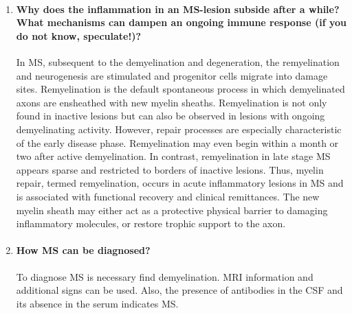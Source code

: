 \documentclass[12pt,article,oneside,a4paper]{memoir}
\begin{document}
\begin{enumerate}
\item \paragraph{Why does the inflammation in an MS-lesion subside after a while?
What mechanisms can dampen an ongoing immune response (if you do not know,
speculate!)?}

In MS, subsequent to the demyelination and degeneration, the remyelination and
neurogenesis are stimulated and progenitor cells migrate into damage sites.
Remyelination is the default spontaneous process in which demyelinated axons
are ensheathed with new myelin sheaths.
Remyelination is not only found in inactive lesions but can also be observed in
lesions with ongoing demyelinating activity. However, repair processes are
especially characteristic of the early disease phase. Remyelination may even
begin within a month or two after active demyelination. In contrast,
remyelination in late stage MS appears sparse and restricted to borders of
inactive lesions. Thus, myelin repair, termed remyelination, occurs in acute
inflammatory lesions in MS and is associated with functional recovery and
clinical remittances. The new myelin sheath may either act as a protective
physical barrier to damaging inflammatory molecules, or restore trophic support
to the axon.

\item \paragraph{How MS can be diagnosed?}
To diagnose MS is necessary find demyelination. MRI information and additional
signs can be used. Also, the presence of antibodies in the CSF and its absence
in the serum indicates MS.

\end{enumerate}


\end{document}
